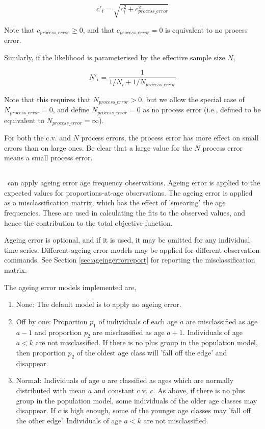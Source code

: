 {{{{\begin{equation}
  c'_i  = \sqrt {c_i^2  + c_{process\_error}^2 } 
\end{equation}

Note that $c_{process\_ error} \ge 0$, and that $c_{process\_ error} = 0$ is equivalent to no process error.

Similarly, if the likelihood is parameterised by the effective sample size $N$,

\begin{equation}
 N'_i  = \frac{1}{1 / {N_i}+ 1 / N_{process\_error}}
\end{equation}

Note that this requires that $N_{process\_ error} > 0$, but we allow the special case of $N_{process\_ error}=0$, and define $N_{process\_ error}=0$ as no process error (i.e., defined to be equivalent to $N_{process\_ error}=\infty$). 

For both the c.v. and $N$ process errors, the process error has more effect on small errors than on large ones. Be clear that a large value for the $N$ process error means a small process error.

\subsection{}

\CNAME\ can apply ageing error age frequency observations. Ageing error is applied to the expected values for proportions-at-age observations. The ageing error is applied as a misclassification matrix, which has the effect of 'smearing' the age frequencies. These are used in calculating the fits to the observed values, and hence the contribution to the total objective function. 

Ageing error is optional, and if it is used, it may be omitted for any individual time series. Different ageing error models may be applied for different observation commands. See Section \ref{sec:ageingerrorreport} for reporting the misclassification matrix.

The ageing error models implemented are,
\begin{enumerate}
  \item{None}: The default model is to apply no ageing error.
  \item{Off by one}: Proportion $p_1$ of individuals of each age $a$ are misclassified as age $a-1$ and proportion $p_2$ are misclassified as age $a+1$. Individuals of age $a < k$ are not misclassified. If there is no plus group in the population model, then proportion $p_2$ of the oldest age class will 'fall off the edge' and disappear. 
  \item{Normal}: Individuals of age $a$ are classified as ages which are normally distributed with mean $a$ and constant c.v. $c$. As above, if there is no plus group in the population model, some individuals of the older age classes may disappear. If $c$ is high enough, some of the younger age classes may 'fall off the other edge'. Individuals of age $a < k$ are not misclassified.
\end{enumerate}

}}}}
